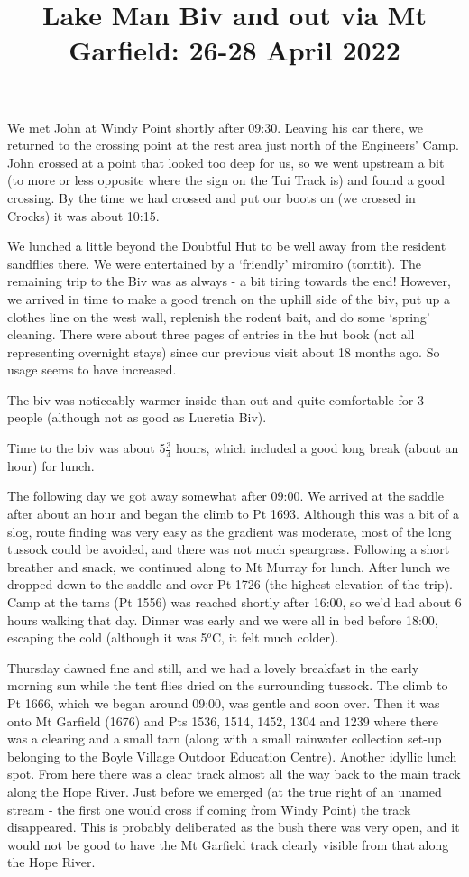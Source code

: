 \documentclass[12pt]{article} %
\title{Lake Man Biv and out via Mt Garfield: 26-28 April 2022}
\makeatletter
\renewcommand{\maketitle}{%
  {\bfseries{\scshape{\Large{\@title\par}}}}
}
\makeatother
\begin{document}
  \maketitle

We met John at Windy Point shortly after 09:30.  Leaving his car there, we returned to the crossing point at the rest area just north of the Engineers' Camp.  John crossed at a point that looked too deep for us, so we went upstream a bit (to more or less opposite where the sign on the Tui Track is) and found a good crossing.  By the time we had crossed and put our boots on (we crossed in Crocks) it was about 10:15.

We lunched a little beyond the Doubtful Hut to be well away from the resident sandflies there.  We were entertained by a `friendly' miromiro (tomtit).  The remaining trip to the Biv was as always - a bit tiring towards the end!  However, we arrived in time to make a good trench on the uphill side of the biv, put up a clothes line on the west wall, replenish the rodent bait, and do some `spring' cleaning.  There were about three pages of entries in the hut book (not all representing overnight stays) since our previous visit about 18 months ago.  So usage seems to have increased.

The biv was noticeably warmer inside than out and quite comfortable for 3 people (although not as good as Lucretia Biv).

Time to the biv was about 5$\frac{3}{4}$ hours, which included a good long break (about an hour) for lunch.

The following day we got away somewhat after 09:00.  We arrived at the saddle after about an hour and began the climb to Pt 1693.  Although this was a bit of a slog, route finding was very easy as the gradient was moderate, most of the long tussock could be avoided, and there was not much speargrass. Following a short breather and snack, we continued along to Mt Murray for lunch.  After lunch we dropped down to the saddle and over Pt 1726 (the highest elevation of the trip).  Camp at the tarns (Pt 1556) was reached shortly after 16:00, so we'd had about 6 hours walking that day.  Dinner was early and we were all in bed before 18:00, escaping the cold (although it was 5$^o$C, it felt much colder).

Thursday dawned fine and still, and we had a lovely breakfast in the early morning sun while the tent flies dried on the surrounding tussock.  The climb to Pt 1666, which we began around 09:00, was gentle and soon over.  Then it was onto Mt Garfield (1676) and Pts 1536, 1514, 1452, 1304 and 1239 where there was a clearing and a small tarn (along with a small rainwater collection set-up belonging to the Boyle Village Outdoor Education Centre).  Another idyllic lunch spot. From here there was a clear track almost all the way back to the main track along the Hope River.  Just before we emerged (at the true right of an unamed stream - the first one would cross if coming from Windy Point) the track disappeared.  This is probably deliberated as the bush there was very open, and it would not be good to have the Mt Garfield track clearly visible from that along the Hope River.
\end{document}
